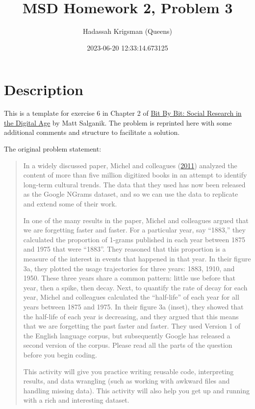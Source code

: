 \documentclass[
]{article}
\title{MSD Homework 2, Problem 3}
\author{Hadassah Krigsman (Queens)}
\date{2023-06-20 12:33:14.673125}
\begin{document}
\maketitle

{
\setcounter{tocdepth}{3}
\tableofcontents
}
\hypertarget{description}{%
\section{Description}\label{description}}

This is a template for exercise 6 in Chapter 2 of
\href{https://www.bitbybitbook.com/en/1st-ed/observing-behavior/observing-activities/}{Bit
By Bit: Social Research in the Digital Age} by Matt Salganik. The
problem is reprinted here with some additional comments and structure to
facilitate a solution.

The original problem statement:

\begin{quote}
In a widely discussed paper, Michel and colleagues
(\href{https://doi.org/10.1126/science.1199644}{2011}) analyzed the
content of more than five million digitized books in an attempt to
identify long-term cultural trends. The data that they used has now been
released as the Google NGrams dataset, and so we can use the data to
replicate and extend some of their work.

In one of the many results in the paper, Michel and colleagues argued
that we are forgetting faster and faster. For a particular year, say
``1883,'' they calculated the proportion of 1-grams published in each
year between 1875 and 1975 that were ``1883''. They reasoned that this
proportion is a measure of the interest in events that happened in that
year. In their figure 3a, they plotted the usage trajectories for three
years: 1883, 1910, and 1950. These three years share a common pattern:
little use before that year, then a spike, then decay. Next, to quantify
the rate of decay for each year, Michel and colleagues calculated the
``half-life'' of each year for all years between 1875 and 1975. In their
figure 3a (inset), they showed that the half-life of each year is
decreasing, and they argued that this means that we are forgetting the
past faster and faster. They used Version 1 of the English language
corpus, but subsequently Google has released a second version of the
corpus. Please read all the parts of the question before you begin
coding.

This activity will give you practice writing reusable code, interpreting
results, and data wrangling (such as working with awkward files and
handling missing data). This activity will also help you get up and
running with a rich and interesting dataset.
\end{quote}
\end{document}
